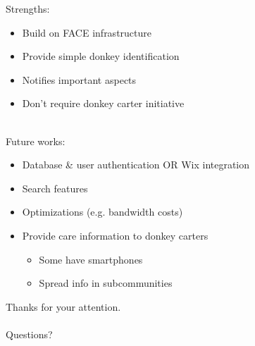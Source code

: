 \documentclass{beamer}
\begin{document}
\begin{frame}
Strengths:
\begin{itemize}
 \item Build on FACE infrastructure
 \pause
 \item Provide simple donkey identification
 \pause
 \item Notifies important aspects
 \pause
 \item Don't require donkey carter initiative
\end{itemize}
~\\
\pause
Future works:
\begin{itemize}
 \item Database \& user authentication OR Wix integration
 \pause
 \item Search features
 \pause
 \item Optimizations (e.g. bandwidth costs)
 \pause
 \item Provide care information to donkey carters
 \begin{itemize}
  \item Some have smartphones
  \item Spread info in subcommunities
 \end{itemize}
\end{itemize}
\end{frame}

\begin{frame}
\begin{center}
Thanks for your attention.\\
~\\
Questions?\\
\end{center}
\end{frame}

\appendix
{}
\setcounter{finalframe}{\value{framenumber}}

% 
% 

\setcounter{framenumber}{\value{finalframe}}
\end{document}
